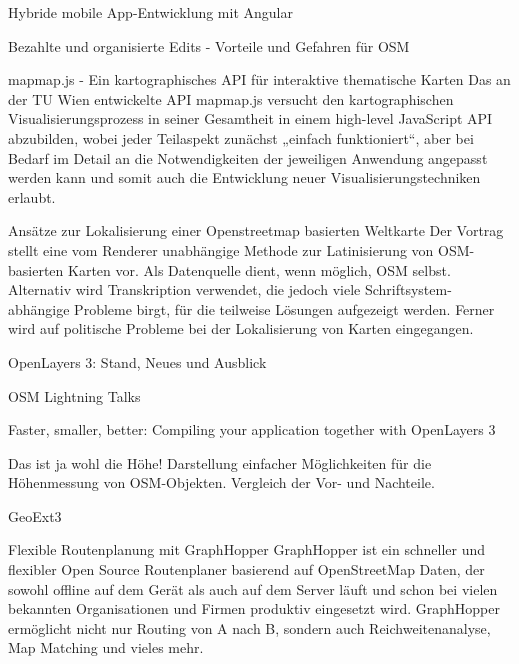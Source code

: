 %
{Hybride mobile App-Entwicklung mit Angular}%
{}%
{}

%
{Bezahlte und organisierte Edits - Vorteile und Gefahren für OSM}%
{}%
{}

%
{mapmap.js - Ein kartographisches API für interaktive thematische Karten}%
{}%
{Das an der TU Wien entwickelte API mapmap.js versucht den kartographischen
Visualisierungsprozess in seiner Gesamtheit in einem high-level JavaScript API
abzubilden, wobei jeder Teilaspekt zunächst „einfach funktioniert“, aber bei
Bedarf im Detail an die Notwendigkeiten der jeweiligen Anwendung angepasst werden
kann und somit auch die Entwicklung neuer Visualisierungstechniken erlaubt.}

%
{Ansätze zur Lokalisierung einer Openstreetmap basierten Weltkarte}%
{}%
{Der Vortrag stellt eine vom Renderer unabhängige Methode zur Latinisierung
von OSM-basierten Karten vor. Als Datenquelle dient, wenn möglich, OSM
selbst. Alternativ wird Transkription verwendet, die jedoch viele
Schriftsystem-abhängige Probleme birgt, für die teilweise Lösungen
aufgezeigt werden. Ferner wird auf politische Probleme bei der Lokalisierung
von Karten eingegangen.}

%
{OpenLayers 3: Stand, Neues und Ausblick}%
{}%
{}

%
{OSM Lightning Talks}%
{}%
{}

%
{Faster, smaller, better: Compiling your application together with OpenLayers 3}%
{}%
{}

%
{Das ist ja wohl die Höhe!}%
{}%
{Darstellung einfacher Möglichkeiten für die Höhenmessung von OSM-Objekten. Vergleich der Vor- und Nachteile.}

%
{GeoExt3}%
{}%
{}

%
{Flexible Routenplanung mit GraphHopper}%
{}%
{GraphHopper ist ein schneller und flexibler Open Source Routenplaner basierend auf OpenStreetMap Daten,
der sowohl offline auf dem Gerät als auch auf dem Server läuft und schon bei vielen bekannten Organisationen
und Firmen produktiv eingesetzt wird. GraphHopper ermöglicht nicht nur Routing von A nach B, sondern auch
Reichweitenanalyse, Map Matching und vieles mehr.}

